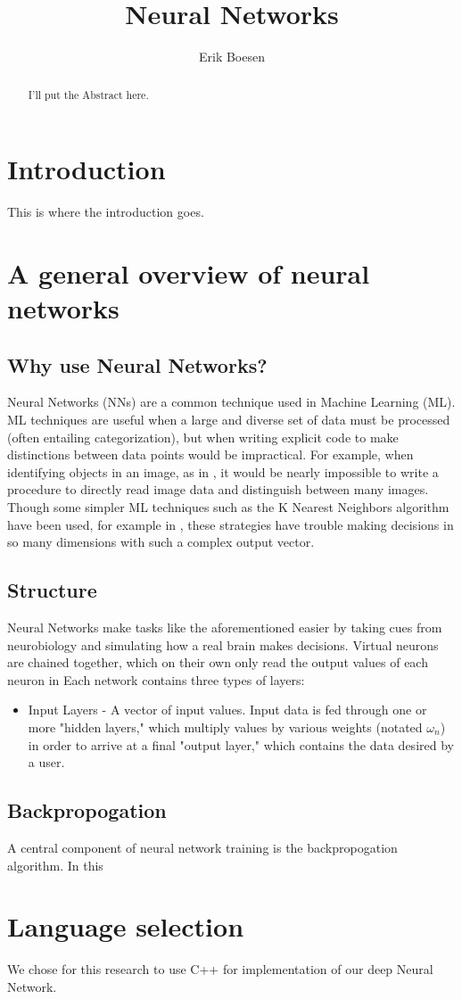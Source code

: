 \documentclass{article}
\begin{document}
\title{Neural Networks}
\author{Erik Boesen}

\maketitle

\begin{abstract}
I'll put the Abstract here.
\end{abstract}

\section{Introduction}
This is where the introduction goes.

\section{A general overview of neural networks}
\subsection{Why use Neural Networks?}
Neural Networks (NNs) are a common technique used in Machine Learning (ML). ML techniques are useful when a large and diverse set of data must be processed (often entailing categorization), but when writing explicit code to make distinctions between data points would be impractical. For example, when identifying objects in an image, as in \cite{hinton12}, it would be nearly impossible to write a procedure to directly read image data and distinguish between many images. Though some simpler ML techniques such as the K Nearest Neighbors algorithm have been used, for example in \cite{knnic}, these strategies have trouble making decisions in so many dimensions with such a complex output vector.

\subsection{Structure}
Neural Networks make tasks like the aforementioned easier by taking cues from neurobiology and simulating how a real brain makes decisions. Virtual neurons are chained together, which on their own only read the output values of each neuron in  Each network contains three types of layers:
\begin{itemize}
\item{Input Layers} - A vector of input values. Input data is fed through one or more "hidden layers," which multiply values by various weights (notated $\omega_n$) in order to arrive at a final "output layer," which contains the data desired by a user.
\end{itemize}

\subsection{Backpropogation}
A central component of neural network training is the backpropogation algorithm. In this

\section{Language selection}
We chose for this research to use C++ for implementation of our deep Neural Network.


\end{document}

